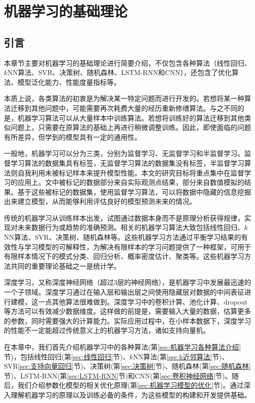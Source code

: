 \chapter{机器学习的基础理论}\label{chap:ml_theory}

\section{引言}

本章节主要对机器学习的基础理论进行简要介绍，不仅包含各种算法（线性回归、$k$NN算法、SVR、决策树、随机森林、LSTM-RNN和CNN），还包含了优化算法、模型泛化能力、性能度量指标等。

本质上说，各类算法的初衷是为解决某一特定问题而进行开发的。若想将某一种算法迁移到其他问题中，可能需要再次耗费大量的经历重新修缮算法。与之不同的是，机器学习算法可以从大量样本中训练算法。若想将训练好的算法迁移到其他类似问题上，只需要在原算法的基础上再进行稍微调整训练。因此，即使面临的问题有所差异，但学到的模型具有一定的通用性\citep{Goodfellow2016Deep}。

一般地，机器学习可以分为三类，分别为监督学习、无监督学习和半监督学习。监督学习算法的数据集具有标签，无监督学习算法的数据集没有标签，半监督学习算法则自我利用未被标记样本来提升模型性能。本文的研究目标将重点集中在监督学习的应用上。文中被标记的数据部分来自实际观测点结果，部分来自数值模拟的结果。基于这些被标记的数据集，使用监督学习算法，可以将数据中隐藏的信息挖掘出来建立模型，从而能够利用评估良好的模型预测未来的情况。

传统的机器学习从训练样本出发，试图通过数据本身而不是原理分析获得规律，实现对未来数据行为或趋势的准确预测。相关的机器学习算法大致包括线性回归、$k$NN算法、SVR、决策树、随机森林等。这些机器学习方法通过平衡学习结果的有效性与学习模型的可解释性，为解决有限样本的学习问题提供了一种框架，可用于有限样本情况下的模式分类、回归分析、概率密度估计、聚类等。这些机器学习方法共同的重要理论基础之一是统计学。

深度学习，又称深度神经网络（超过3层的神经网络），是机器学习中发展最迅速的一个子领域。深度学习通过在输入层和输出层之间使用隐藏层对数据的中间表征进行建模，这一点其他算法很难做到。深度学习中的卷积计算、池化计算、dropout等方法可以有效减少数据维度。这样做的前提是，需要输入大量的数据，估算更多的参数，同时需要强大的计算能力。实际应用过程中，在小样本数据下，深度学习的性能不一定能超过传统意义上的机器学习方法，诸如支持向量机。

在本章中，我们首先介绍机器学习中的各种算法(第\ref{sec:机器学习各种算法介绍}节)，包括线性回归(第\ref{sec:线性回归}节)、$k$NN算法(第\ref{sec:k近邻算法}节)、SVR\ref{sec:支持向量回归}节)、决策树(第\ref{sec:决策树}节)、随机森林(第\ref{sec:随机森林}节)、LSTM-RNN(第\ref{sec:LSTM-RNN}节)和CNN(第\ref{sec:卷积神经网络}节)。随后，我们介绍参数化模型的相关优化原理(第\ref{sec:机器学习模型的优化}节)。通过深入理解机器学习的原理以及训练必备的条件，为这些模型的构建和开发提供基础。


